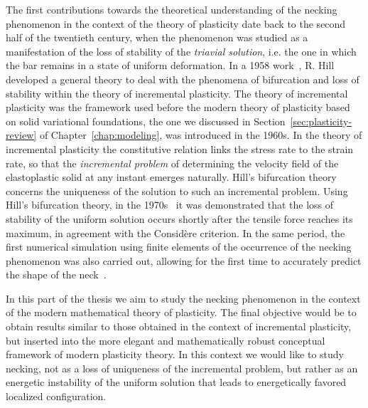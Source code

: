 \documentclass[a4paper,10pt,twoside]{amsbook}
\numberwithin{section}{chapter}
\numberwithin{equation}{chapter}
\theoremstyle{definition}
\begin{document}
The first contributions towards the theoretical understanding of the necking phenomenon in the context of the theory of plasticity date back to the second half of the twentieth century, when the phenomenon was studied as a manifestation of the loss of stability of the \emph{triavial solution}, i.e. the one in which the bar remains in a state of uniform deformation. In a 1958 work~\cite{Hill1958}, R. Hill developed a general theory to deal with the phenomena of bifurcation and loss of stability within the theory of incremental plasticity. The theory of incremental plasticity was the framework used before the modern theory of plasticity based on solid variational foundations, the one we discussed in Section~\ref{sec:plasticity-review} of Chapter~\ref{chap:modeling}, was introduced in the 1960s. In the theory of incremental plasticity the constitutive relation links the stress rate to the strain rate, so that the \emph{incremental problem} of determining the velocity field of the elastoplastic solid at any instant emerges naturally. Hill's bifurcation theory concerns the uniqueness of the solution to such an incremental problem. Using Hill's bifurcation theory, in the 1970s~\cite{HillHutchinson1975,HutchinsonMiles1974} it was demonstrated that the loss of stability of the uniform solution occurs shortly after the tensile force reaches its maximum, in agreement with the Considère criterion. In the same period, the first numerical simulation using finite elements of the occurrence of the necking phenomenon was also carried out, allowing for the first time to accurately predict the shape of the neck~\cite{Needleman1972}.

In this part of the thesis we aim to study the necking phenomenon in the context of the modern mathematical theory of plasticity. The final objective would be to obtain results similar to those obtained in the context of incremental plasticity, but inserted into the more elegant and mathematically robust conceptual framework of modern plasticity theory. In this context we would like to study necking, not as a loss of uniqueness of the incremental problem, but rather as an energetic instability of the uniform solution that leads to energetically favored localized configuration.
\end{document}
